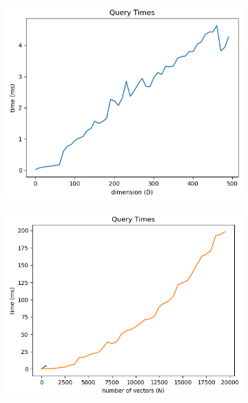 \documentclass [a4paper, 11pt] {article}
\begin{document}
\begin{enumerate}
	\begin{figure}[!h]
		\centering
		\begin{subfigure}{0.4\textwidth}
			\centering
			\includegraphics[width=\textwidth]{1_1_a.png}
			\caption{}
			\label{fig:1a}
		\end{subfigure}
		\begin{subfigure}{0.4\textwidth}
			\centering
			\includegraphics[width=\textwidth]{1_1_b.png}
			\caption{}
			\label{fig:1b}
		\end{subfigure}
		\begin{subfigure}{0.4\textwidth}
			\centering

\end{subfigure}
\end{figure}
\end{enumerate}
\end{document}
